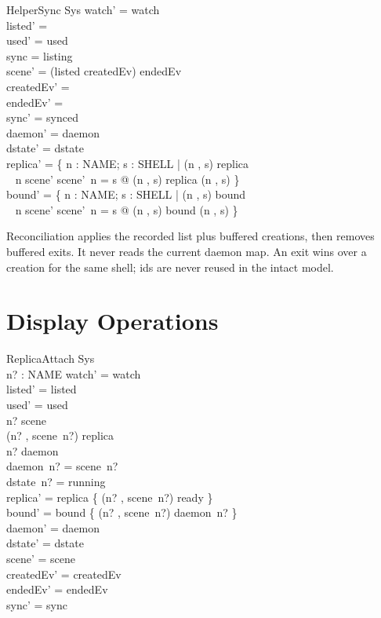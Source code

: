 \documentclass[a4paper,10pt,fleqn]{article}
\begin{document}
\begin{schema}{HelperSync}
  \Delta Sys
\where
  watch' = watch \\
  listed' = \emptyset \\
  used' = used \\
  sync = listing \\
  scene' = (listed \cup createdEv) \setminus endedEv \\
  createdEv' = \emptyset \\
  endedEv' = \emptyset \\
  sync' = synced \\
  daemon' = daemon \\
  dstate' = dstate \\
  replica' = \{ n : NAME; s : SHELL | (n , s) \in \dom replica \\
    \quad~ \land n \in \dom scene' \land scene'~n = s @ (n , s) \mapsto replica (n , s) \} \\
  bound' = \{ n : NAME; s : SHELL | (n , s) \in \dom bound \\
    \quad~ \land n \in \dom scene' \land scene'~n = s @ (n , s) \mapsto bound (n , s) \}
\end{schema}

Reconciliation applies the recorded list plus buffered creations, then
removes buffered exits. It never reads the current daemon map. An exit wins
over a creation for the same shell; ids are never reused in the intact model.

\section{Display Operations}

\begin{schema}{ReplicaAttach}
  \Delta Sys \\
  n? : NAME
\where
  watch' = watch \\
  listed' = listed \\
  used' = used \\
  n? \in \dom scene \\
  (n? , scene~n?) \notin \dom replica \\
  n? \in \dom daemon \\
  daemon~n? = scene~n? \\
  dstate~n? = running \\
  replica' = replica \cup \{ (n? , scene~n?) \mapsto ready \} \\
  bound' = bound \cup \{ (n? , scene~n?) \mapsto daemon~n? \} \\
  daemon' = daemon \\
  dstate' = dstate \\
  scene' = scene \\
  createdEv' = createdEv \\
  endedEv' = endedEv \\
  sync' = sync
\end{schema}
\end{document}
